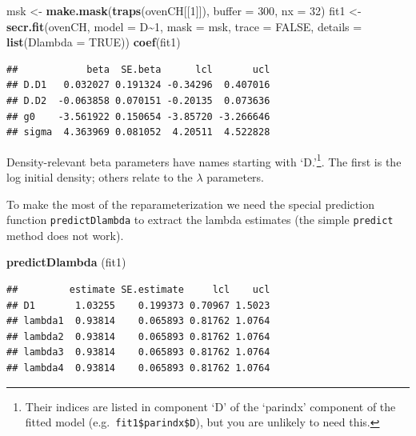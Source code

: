 \documentclass[
]{book}
\newenvironment{Shaded}{\begin{snugshade}}{\end{snugshade}}
\newcommand{\AttributeTok}[1]{\textcolor[rgb]{0.13,0.29,0.53}{#1}}
\newcommand{\ConstantTok}[1]{\textcolor[rgb]{0.56,0.35,0.01}{#1}}
\newcommand{\DecValTok}[1]{\textcolor[rgb]{0.00,0.00,0.81}{#1}}
\newcommand{\FunctionTok}[1]{\textcolor[rgb]{0.13,0.29,0.53}{\textbf{#1}}}
\newcommand{\NormalTok}[1]{#1}
\newcommand{\OtherTok}[1]{\textcolor[rgb]{0.56,0.35,0.01}{#1}}
\newcommand{\SpecialCharTok}[1]{\textcolor[rgb]{0.81,0.36,0.00}{\textbf{#1}}}
\begin{document}
\begin{Shaded}
\begin{Highlighting}[]
\NormalTok{ msk }\OtherTok{\textless{}{-}} \FunctionTok{make.mask}\NormalTok{(}\FunctionTok{traps}\NormalTok{(ovenCH[[}\DecValTok{1}\NormalTok{]]), }\AttributeTok{buffer =} \DecValTok{300}\NormalTok{, }\AttributeTok{nx =} \DecValTok{32}\NormalTok{)}
\NormalTok{ fit1  }\OtherTok{\textless{}{-}} \FunctionTok{secr.fit}\NormalTok{(ovenCH, }\AttributeTok{model =}\NormalTok{ D}\SpecialCharTok{\textasciitilde{}}\DecValTok{1}\NormalTok{, }\AttributeTok{mask =}\NormalTok{ msk, }\AttributeTok{trace =} 
     \ConstantTok{FALSE}\NormalTok{, }\AttributeTok{details =} \FunctionTok{list}\NormalTok{(}\AttributeTok{Dlambda =} \ConstantTok{TRUE}\NormalTok{))}
 \FunctionTok{coef}\NormalTok{(fit1)}
\end{Highlighting}
\end{Shaded}

\begin{verbatim}
##            beta  SE.beta      lcl       ucl
## D.D1   0.032027 0.191324 -0.34296  0.407016
## D.D2  -0.063858 0.070151 -0.20135  0.073636
## g0    -3.561922 0.150654 -3.85720 -3.266646
## sigma  4.363969 0.081052  4.20511  4.522828
\end{verbatim}

Density-relevant beta parameters have names starting with `D.'\footnote{Their indices are listed in component `D' of the `parindx' component of the fitted model (e.g.~\texttt{fit1\$parindx\$D}), but you are unlikely to need this.}. The first is the log initial density; others relate to the \(\lambda\) parameters.

To make the most of the reparameterization we need the special prediction function \texttt{predictDlambda} to extract the lambda estimates (the simple \texttt{predict} method does not work).

\begin{Shaded}
\begin{Highlighting}[]
 \FunctionTok{predictDlambda}\NormalTok{ (fit1)}
\end{Highlighting}
\end{Shaded}

\begin{verbatim}
##         estimate SE.estimate     lcl    ucl
## D1       1.03255    0.199373 0.70967 1.5023
## lambda1  0.93814    0.065893 0.81762 1.0764
## lambda2  0.93814    0.065893 0.81762 1.0764
## lambda3  0.93814    0.065893 0.81762 1.0764
## lambda4  0.93814    0.065893 0.81762 1.0764
\end{verbatim}
\end{document}
